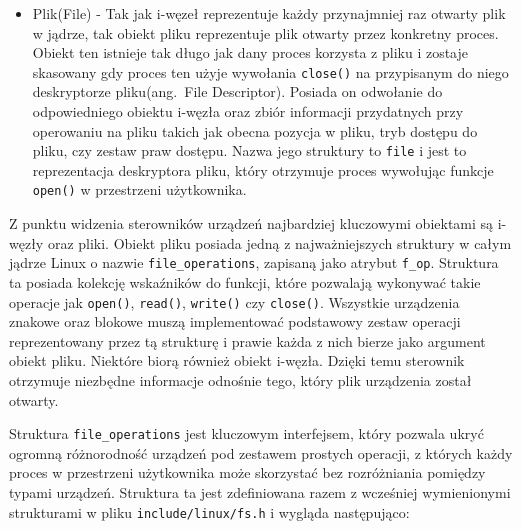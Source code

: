 \documentclass[11pt]{scrartcl}
\begin{document}
\begin{itemize}
\item
    Plik(File) - Tak jak i-węzeł reprezentuje każdy przynajmniej raz otwarty plik w jądrze, tak obiekt pliku reprezentuje plik otwarty przez konkretny proces. Obiekt ten istnieje tak długo jak dany proces korzysta z pliku i zostaje skasowany gdy proces ten użyje wywołania \texttt{close()} na przypisanym do niego deskryptorze pliku(ang.\ File Descriptor). Posiada on odwołanie do odpowiedniego obiektu i-węzła oraz zbiór informacji przydatnych przy operowaniu na pliku takich jak obecna pozycja w pliku, tryb dostępu do pliku, czy zestaw praw dostępu. Nazwa jego struktury to \texttt{file} i jest to reprezentacja deskryptora pliku, który otrzymuje proces wywołując funkcje \texttt{open()} w przestrzeni użytkownika.
\end{itemize}

Z punktu widzenia sterowników urządzeń najbardziej kluczowymi obiektami są i-węzły oraz pliki. Obiekt pliku posiada jedną z najważniejszych struktury w całym jądrze Linux o nazwie \texttt{file\_operations}, zapisaną jako atrybut \texttt{f\_op}. Struktura ta posiada kolekcję wskaźników do funkcji, które pozwalają wykonywać takie operacje jak \texttt{open()}, \texttt{read()}, \texttt{write()} czy \texttt{close()}. Wszystkie urządzenia znakowe oraz blokowe muszą implementować podstawowy zestaw operacji reprezentowany przez tą strukturę i prawie każda z nich bierze jako argument obiekt pliku. Niektóre biorą również obiekt i-węzła. Dzięki temu sterownik otrzymuje niezbędne informacje odnośnie tego, który plik urządzenia został otwarty.

Struktura \texttt{file\_operations} jest kluczowym interfejsem, który pozwala ukryć ogromną różnorodność urządzeń pod zestawem prostych operacji, z których każdy proces w przestrzeni użytkownika może skorzystać bez rozróżniania pomiędzy typami urządzeń. Struktura ta jest zdefiniowana razem z wcześniej wymienionymi strukturami w pliku \texttt{include/linux/fs.h} i wygląda następująco:
\end{document}
